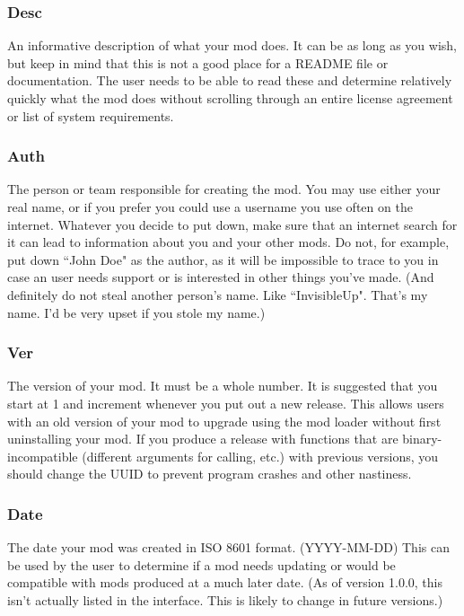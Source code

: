 \documentclass[12pt,a4paper,notitlepage]{article}
\begin{document}
\subsubsection{Desc}
\label{subsubsec:create-meta-desc}
An informative description of what your mod does. It can be as long as you wish, but keep in mind that this is not a good place for a README file or documentation. The user needs to be able to read these and determine relatively quickly what the mod does without scrolling through an entire license agreement or list of system requirements.

\subsubsection{Auth}
\label{subsubsec:create-meta-auth}
The person or team responsible for creating the mod. You may use either your real name, or if you prefer you could use a username you use often on the internet. Whatever you decide to put down, make sure that an internet search for it can lead to information about you and your other mods. Do not, for example, put down ``John Doe" as the author, as it will be impossible to trace to you in case an user needs support or is interested in other things you've made. (And definitely do not steal another person's name. Like ``InvisibleUp". That's my name. I'd be very upset if you stole my name.)

\subsubsection{Ver}
\label{subsubsec:create-meta-ver}
The version of your mod. It must be a whole number. It is suggested that you start at 1 and increment whenever you put out a new release. This allows users with an old version of your mod to upgrade using the mod loader without first uninstalling your mod. If you produce a release with functions that are binary-incompatible (different arguments for calling, etc.) with previous versions, you should change the UUID to prevent program crashes and other nastiness.

\subsubsection{Date}
\label{subsubsec:create-meta-date}
The date your mod was created in ISO 8601 format. (YYYY-MM-DD) This can be used by the user to determine if a mod needs updating or would be compatible with mods produced at a much later date. (As of version 1.0.0, this isn't actually listed in the interface. This is likely to change in future versions.)
\end{document}
